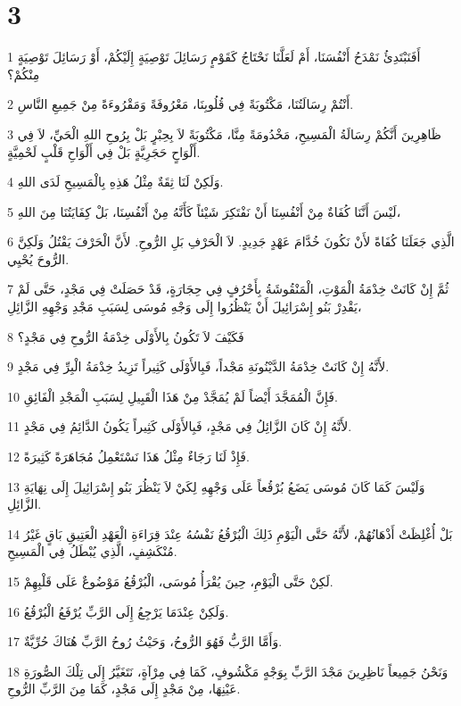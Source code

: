 \chapter{3}

\par 1 أَفَنَبْتَدِئُ نَمْدَحُ أَنْفُسَنَا، أَمْ لَعَلَّنَا نَحْتَاجُ كَقَوْمٍ رَسَائِلَ تَوْصِيَةٍ إِلَيْكُمْ، أَوْ رَسَائِلَ تَوْصِيَةٍ مِنْكُمْ؟
\par 2 أَنْتُمْ رِسَالَتُنَا، مَكْتُوبَةً فِي قُلُوبِنَا، مَعْرُوفَةً وَمَقْرُوءَةً مِنْ جَمِيعِ النَّاسِ.
\par 3 ظَاهِرِينَ أَنَّكُمْ رِسَالَةُ الْمَسِيحِ، مَخْدُومَةً مِنَّا، مَكْتُوبَةً لاَ بِحِبْرٍ بَلْ بِرُوحِ اللهِ الْحَيِّ، لاَ فِي أَلْوَاحٍ حَجَرِيَّةٍ بَلْ فِي أَلْوَاحِ قَلْبٍ لَحْمِيَّةٍ.
\par 4 وَلَكِنْ لَنَا ثِقَةٌ مِثْلُ هَذِهِ بِالْمَسِيحِ لَدَى اللهِ.
\par 5 لَيْسَ أَنَّنَا كُفَاةٌ مِنْ أَنْفُسِنَا أَنْ نَفْتَكِرَ شَيْئاً كَأَنَّهُ مِنْ أَنْفُسِنَا، بَلْ كِفَايَتُنَا مِنَ اللهِ،
\par 6 الَّذِي جَعَلَنَا كُفَاةً لأَنْ نَكُونَ خُدَّامَ عَهْدٍ جَدِيدٍ. لاَ الْحَرْفِ بَلِ الرُّوحِ. لأَنَّ الْحَرْفَ يَقْتُلُ وَلَكِنَّ الرُّوحَ يُحْيِي.
\par 7 ثُمَّ إِنْ كَانَتْ خِدْمَةُ الْمَوْتِ، الْمَنْقُوشَةُ بِأَحْرُفٍ فِي حِجَارَةٍ، قَدْ حَصَلَتْ فِي مَجْدٍ، حَتَّى لَمْ يَقْدِرْ بَنُو إِسْرَائِيلَ أَنْ يَنْظُرُوا إِلَى وَجْهِ مُوسَى لِسَبَبِ مَجْدِ وَجْهِهِ الزَّائِلِ،
\par 8 فَكَيْفَ لاَ تَكُونُ بِالأَوْلَى خِدْمَةُ الرُّوحِ فِي مَجْدٍ؟
\par 9 لأَنَّهُ إِنْ كَانَتْ خِدْمَةُ الدَّيْنُونَةِ مَجْداً، فَبِالأَوْلَى كَثِيراً تَزِيدُ خِدْمَةُ الْبِرِّ فِي مَجْدٍ.
\par 10 فَإِنَّ الْمُمَجَّدَ أَيْضاً لَمْ يُمَجَّدْ مِنْ هَذَا الْقَبِيلِ لِسَبَبِ الْمَجْدِ الْفَائِقِ.
\par 11 لأَنَّهُ إِنْ كَانَ الزَّائِلُ فِي مَجْدٍ، فَبِالأَوْلَى كَثِيراً يَكُونُ الدَّائِمُ فِي مَجْدٍ.
\par 12 فَإِذْ لَنَا رَجَاءٌ مِثْلُ هَذَا نَسْتَعْمِلُ مُجَاهَرَةً كَثِيرَةً.
\par 13 وَلَيْسَ كَمَا كَانَ مُوسَى يَضَعُ بُرْقُعاً عَلَى وَجْهِهِ لِكَيْ لاَ يَنْظُرَ بَنُو إِسْرَائِيلَ إِلَى نِهَايَةِ الزَّائِلِ.
\par 14 بَلْ أُغْلِظَتْ أَذْهَانُهُمْ، لأَنَّهُ حَتَّى الْيَوْمِ ذَلِكَ الْبُرْقُعُ نَفْسُهُ عِنْدَ قِرَاءَةِ الْعَهْدِ الْعَتِيقِ بَاقٍ غَيْرُ مُنْكَشِفٍ، الَّذِي يُبْطَلُ فِي الْمَسِيحِ.
\par 15 لَكِنْ حَتَّى الْيَوْمِ، حِينَ يُقْرَأُ مُوسَى، الْبُرْقُعُ مَوْضُوعٌ عَلَى قَلْبِهِمْ.
\par 16 وَلَكِنْ عِنْدَمَا يَرْجِعُ إِلَى الرَّبِّ يُرْفَعُ الْبُرْقُعُ.
\par 17 وَأَمَّا الرَّبُّ فَهُوَ الرُّوحُ، وَحَيْثُ رُوحُ الرَّبِّ هُنَاكَ حُرِّيَّةٌ.
\par 18 وَنَحْنُ جَمِيعاً نَاظِرِينَ مَجْدَ الرَّبِّ بِوَجْهٍ مَكْشُوفٍ، كَمَا فِي مِرْآةٍ، نَتَغَيَّرُ إِلَى تِلْكَ الصُّورَةِ عَيْنِهَا، مِنْ مَجْدٍ إِلَى مَجْدٍ، كَمَا مِنَ الرَّبِّ الرُّوحِ.

